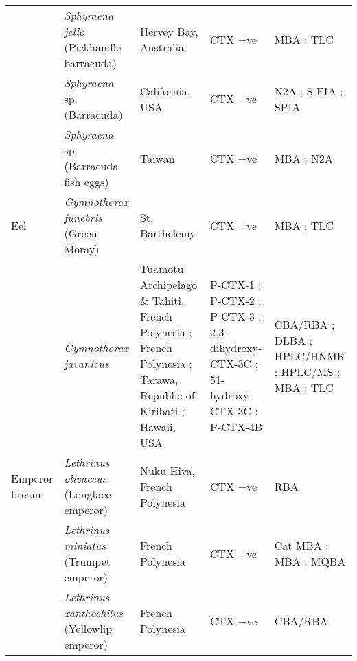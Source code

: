\documentclass[12pt]{article}
\begin{document}
\begin{longtable}{  | p{2cm} | p{3cm} | p{4.5cm}  | p{2cm} | p{3cm}  | }
 & \emph{Sphyraena jello}  (Pickhandle barracuda) & Hervey Bay, Australia \cite{lewis1984ciguatoxin} & CTX +ve \cite{lewis1984ciguatoxin} & MBA \cite{lewis1984ciguatoxin}; TLC \cite{lewis1984ciguatoxin} \\
 & \emph{Sphyraena} sp. (Barracuda) & California, USA \cite{hokama1990simplified} & CTX +ve \cite{hokama1990simplified} & N2A \cite{hokama1990simplified}; S-EIA \cite{hokama1990simplified}; SPIA \cite{hokama1990simplified} \\
 & \emph{Sphyraena} sp. (Barracuda fish eggs) & Taiwan \cite{hung2005persistent} & CTX +ve \cite{hung2005persistent} & MBA \cite{hung2005persistent}; N2A \cite{hung2005persistent} \\
 \hline
 Eel &  \emph{Gymnothorax funebris} (Green Moray) & St. Barthelemy \cite{vernoux1986heterogeneity}  & CTX +ve \cite{vernoux1986heterogeneity}  & MBA \cite{vernoux1986heterogeneity}; TLC \cite{vernoux1986heterogeneity} \\
  &  \emph{Gymnothorax javanicus} & Tuamotu Archipelago \& Tahiti, French Polynesia \cite{labrousse1996toxicological,murata1990structures,legrand1997two}; French Polynesia \cite{chinain2014mail}; Tarawa, Republic of Kiribati \cite{lewis1997characterization}; Hawaii, USA \cite{scheuer1967ciguatoxin} & P-CTX-1 \cite{murata1990structures,lewis1991purification,lewis1997characterization}; P-CTX-2 \cite{lewis1991purification}; P-CTX-3 \cite{lewis1991purification,lewis1997characterization}; 2,3-dihydroxy-CTX-3C \cite{satake1998isolation}; 51-hydroxy-CTX-3C \cite{satake1998isolation}; P-CTX-4B \cite{murata1990structures,lewis1991purification} & CBA/RBA \cite{chinain2014mail}; DLBA \cite{labrousse1996toxicological}; HPLC/HNMR \cite{murata1990structures,lewis1991purification}; HPLC/MS \cite{lewis1997characterization,satake1998isolation}; MBA \cite{lewis1997characterization,scheuer1967ciguatoxin,satake1998isolation}; TLC \cite{scheuer1967ciguatoxin} \\
  \hline
 Emperor bream & \emph{Lethrinus olivaceus} (Longface emperor) &  Nuku Hiva, French Polynesia \cite{darius2007ciguatera} & CTX +ve \cite{darius2007ciguatera} & RBA \cite{darius2007ciguatera} \\
  & \emph{Lethrinus miniatus} (Trumpet emperor) & French Polynesia \cite{bagnis1987use} & CTX +ve \cite{bagnis1987use} & Cat MBA \cite{bagnis1987use}; MBA \cite{bagnis1987use}; MQBA \cite{bagnis1987use} \\
  & \emph{Lethrinus xanthochilus} (Yellowlip emperor) & French Polynesia \cite{chinain2014mail} & CTX +ve \cite{chinain2014mail} & CBA/RBA \cite{chinain2014mail} \\

\end{longtable}
\end{document}
